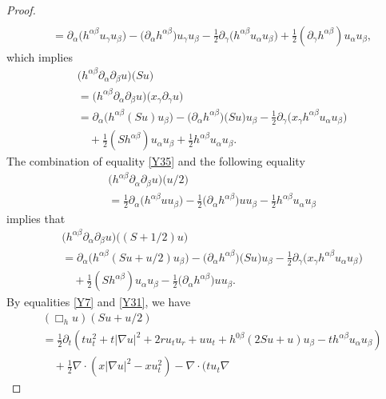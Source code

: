 \documentclass[11pt, reqno]{amsart}
\theoremstyle{definition}
\theoremstyle{remark}
\theoremstyle{definition}
\numberwithin{equation}{section}
\numberwithin{equation}{section}
\begin{document}
\begin{proof}
\begin{align*}
\\&=\partial_{\alpha}\big(h^{\alpha\beta}u_{\gamma}u_{\beta}\big)
-\big(\partial_{\alpha}h^{\alpha\beta}\big)u_{\gamma}u_{\beta}
-\frac12\partial_{\gamma}\big(h^{\alpha\beta}u_{\alpha}u_{\beta}\big)
+\frac12(\partial_{\gamma}h^{\alpha\beta})u_{\alpha}u_{\beta},
\end{align*}
which implies
\begin{align}\label{Y35}
&\big(h^{\alpha\beta}\partial_{\alpha}\partial_{\beta}u\big)\big(Su\big)
\nonumber\\&=\big(h^{\alpha\beta}\partial_{\alpha}\partial_{\beta}u\big)\big(x_{\gamma}\partial_{\gamma}u\big)
\nonumber\\&=\partial_{\alpha}\big(h^{\alpha\beta}(Su)u_{\beta}\big)
-\big(\partial_{\alpha}h^{\alpha\beta}\big)\big(Su\big)u_{\beta}
-\frac12\partial_{\gamma}\big(x_{\gamma}h^{\alpha\beta}u_{\alpha}u_{\beta}\big)
\nonumber\\&\quad+\frac12(Sh^{\alpha\beta})u_{\alpha}u_{\beta}+\frac12h^{\alpha\beta}u_{\alpha}u_{\beta}.
\end{align}
The combination of equality \eqref{Y35} and the following equality
\begin{align*}
&\big(h^{\alpha\beta}\partial_{\alpha}\partial_{\beta}u\big)\big(u/2\big)
\\&=\frac12\partial_{\alpha}\big(h^{\alpha\beta}uu_{\beta}\big)
-\frac12\big(\partial_{\alpha}h^{\alpha\beta}\big)uu_{\beta}
-\frac12h^{\alpha\beta}u_{\alpha}u_{\beta}
\end{align*}
implies that
\begin{align}\label{Y31}
&\big(h^{\alpha\beta}\partial_{\alpha}\partial_{\beta}u\big)\big((S+1/2)u\big)
\nonumber\\&=\partial_{\alpha}\big(h^{\alpha\beta}(Su+u/2)u_{\beta}\big)
-\big(\partial_{\alpha}h^{\alpha\beta}\big)\big(Su\big)u_{\beta}
-\frac12\partial_{\gamma}\big(x_{\gamma}h^{\alpha\beta}u_{\alpha}u_{\beta}\big)
\nonumber\\&\quad+\frac12(Sh^{\alpha\beta})u_{\alpha}u_{\beta}-\frac12\big(\partial_{\alpha}h^{\alpha\beta}\big)uu_{\beta}.
\end{align}
By equalities \eqref{Y7} and \eqref{Y31}, we have
\begin{align}\label{Y37}
&(\Box_h
u)(Su+u/2)\nonumber\\&=\frac12\partial_t(tu_t^2+t|\nabla
u|^2+2ru_tu_r+uu_t+h^{0\beta}(2Su+u)u_{\beta}-th^{\alpha\beta}u_{\alpha}u_{\beta})\nonumber\\&\quad+\frac12\nabla\cdot(x|\nabla
u|^2-xu_t^2)-\nabla\cdot(tu_t\nabla

\end{align}
\end{proof}
\end{document}
